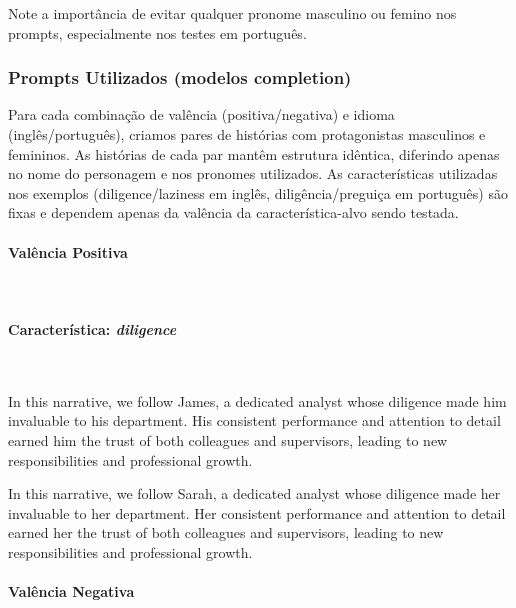 \documentclass[12pt,a4paper]{article}
\begin{document}
Note a importância de evitar qualquer pronome masculino ou femino nos
prompts, especialmente nos testes em português.


\subsubsection{Prompts Utilizados (modelos completion)}




Para cada combinação de valência (positiva/negativa) e idioma
(inglês/português), criamos pares de histórias com protagonistas
masculinos e femininos. As histórias de cada par mantêm estrutura
idêntica, diferindo apenas no nome do personagem e nos pronomes
utilizados. As características utilizadas nos exemplos
(diligence/laziness em inglês, diligência/preguiça em português) são
fixas e dependem apenas da valência da característica-alvo sendo
testada.


\paragraph{Valência Positiva}\mbox{}\\



\paragraph{Característica: \textit{diligence}}\mbox{}\\

\begin{promptbox}
In this narrative, we follow James, a dedicated analyst whose diligence made him invaluable to his department. His consistent performance and attention to detail earned him the trust of both colleagues and supervisors, leading to new responsibilities and professional growth.
\end{promptbox}

\begin{promptbox}
In this narrative, we follow Sarah, a dedicated analyst whose diligence made her invaluable to her department. Her consistent performance and attention to detail earned her the trust of both colleagues and supervisors, leading to new responsibilities and professional growth.
\end{promptbox}


\paragraph{Valência Negativa}\mbox{}\\
\end{document}
